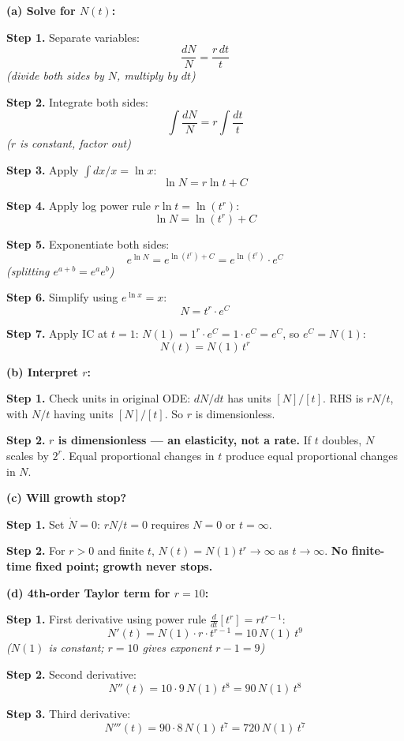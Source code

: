 \documentclass[10pt]{article}
\newcommand{\stepwhy}[1]{\textcolor{blue!60!black}{\small\textit{(#1)}}}
\begin{document}
\begin{solution}
\textbf{(a) Solve for $N(t)$:}

\textbf{Step 1.} Separate variables:
\[
\frac{dN}{N} = \frac{r\,dt}{t}
\]
\stepwhy{divide both sides by $N$, multiply by $dt$}

\textbf{Step 2.} Integrate both sides:
\[
\int\frac{dN}{N} = r\int\frac{dt}{t}
\]
\stepwhy{$r$ is constant, factor out}

\textbf{Step 3.} Apply $\int dx/x = \ln x$:
\[
\ln N = r\ln t + C
\]

\textbf{Step 4.} Apply log power rule $r\ln t = \ln(t^r)$:
\[
\ln N = \ln(t^r) + C
\]

\textbf{Step 5.} Exponentiate both sides:
\[
e^{\ln N} = e^{\ln(t^r) + C} = e^{\ln(t^r)}\cdot e^C
\]
\stepwhy{splitting $e^{a+b} = e^a e^b$}

\textbf{Step 6.} Simplify using $e^{\ln x} = x$:
\[
N = t^r\cdot e^C
\]

\textbf{Step 7.} Apply IC at $t=1$: $N(1) = 1^r\cdot e^C = 1\cdot e^C = e^C$, so $e^C = N(1)$:
\[
\boxed{N(t) = N(1)\,t^r}
\]

\medskip\textbf{(b) Interpret $r$:}

\textbf{Step 1.} Check units in original ODE: $dN/dt$ has units $[N]/[t]$. RHS is $rN/t$, with $N/t$ having units $[N]/[t]$. So $r$ is dimensionless.

\textbf{Step 2.} \textbf{$r$ is dimensionless --- an elasticity, not a rate.} If $t$ doubles, $N$ scales by $2^r$. Equal proportional changes in $t$ produce equal proportional changes in $N$.

\medskip\textbf{(c) Will growth stop?}

\textbf{Step 1.} Set $\dot N = 0$: $rN/t = 0$ requires $N = 0$ or $t = \infty$.

\textbf{Step 2.} For $r > 0$ and finite $t$, $N(t) = N(1)t^r \to \infty$ as $t \to \infty$. \textbf{No finite-time fixed point; growth never stops.}

\medskip\textbf{(d) 4th-order Taylor term for $r=10$:}

\textbf{Step 1.} First derivative using power rule $\frac{d}{dt}[t^r] = rt^{r-1}$:
\[
N'(t) = N(1)\cdot r\cdot t^{r-1} = 10\,N(1)\,t^9
\]
\stepwhy{$N(1)$ is constant; $r=10$ gives exponent $r-1=9$}

\textbf{Step 2.} Second derivative:
\[
N''(t) = 10\cdot 9\,N(1)\,t^8 = 90\,N(1)\,t^8
\]

\textbf{Step 3.} Third derivative:
\[
N'''(t) = 90\cdot 8\,N(1)\,t^7 = 720\,N(1)\,t^7
\]


\end{solution}
\end{document}
